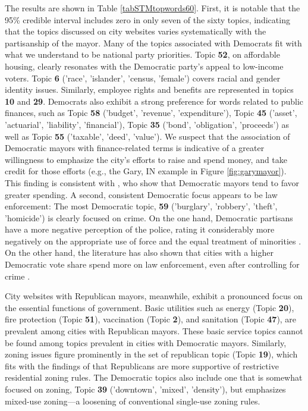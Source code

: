 \documentclass[11pt]{article}
\begin{document}
The results are shown in Table \ref{tabSTMtopwords60}. First, it is notable that the 95\% credible interval includes zero in only seven of the sixty topics, indicating that the topics discussed on city websites varies systematically with the partisanship of the mayor. Many of the topics associated with Democrats fit with what we understand to be national party priorities. Topic \textbf{52}, on affordable housing, clearly resonates with the Democratic party's appeal to low-income voters. Topic {\bf 6} ('race', 'islander', 'census, 'female') covers racial and gender identity issues. Similarly, employee rights and benefits are represented in topics \textbf{10} and \textbf{29}. Democrats also exhibit a strong preference for words related to public finances, such as Topic \textbf{58} ('budget', 'revenue', 'expenditure'), Topic {\bf 45} ('asset', 'actuarial', 'liability', 'financial'), Topic \textbf{35} ('bond', 'obligation', 'proceeds') as well as Topic \textbf{55} ('taxable', 'deed', 'value'). We suspect that the association of Democratic mayors with finance-related terms is indicative of a greater willingness to emphasize the city's efforts to raise and spend money, and take credit for those efforts (e.g., the Gary, IN example in Figure \ref{fig:garymayor}). This finding is consistent with \cite{Einstein2015}, who show that Democratic mayors tend to favor greater spending. A second, consistent Democratic focus appears to be law enforcement: The most Democratic topic, \textbf{59} ('burglary', 'robbery', 'theft', 'homicide') is clearly focused on crime. On the one hand, Democratic partisans have a more negative perception of the police, rating it considerably more negatively on the appropriate use of force and the equal treatment of minorities \citep{brown2017different}. On the other hand, the literature has also shown that cities with a higher Democratic vote share spend more on law enforcement, even after controlling for crime \citep{Einstein2015}. 

City websites with Republican mayors, meanwhile, exhibit a pronounced focus on the essential functions of government. Basic utilities such as energy (Topic \textbf{20}), fire protection (Topic \textbf{51}), vaccination (Topic \textbf{2}),  and sanitation (Topic \textbf{47}), are prevalent among cities with Republican mayors. These basic service topics cannot be found among topics prevalent in cities with Democratic mayors. Similarly, zoning issues figure prominently in the set of republican topic (Topic \textbf{19}), which fits with the findings of \citet{sorens2018effects} that Republicans are more supportive of restrictive residential zoning rules. The Democratic topics also include one that is somewhat focused on zoning, Topic {\bf 39} ('downtown', 'mixed', 'density'), but emphasizes mixed-use zoning---a loosening of conventional single-use zoning rules.
\end{document}
